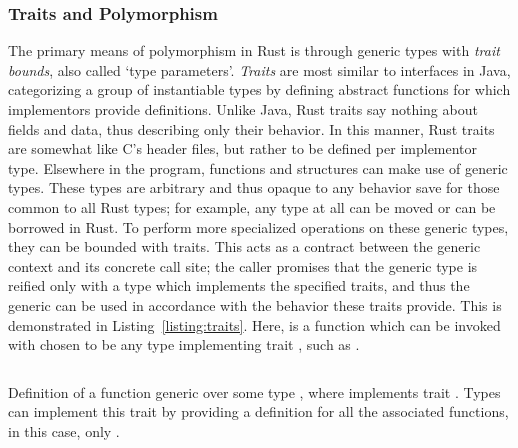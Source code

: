\subsubsection{Traits and Polymorphism}
The primary means of polymorphism in Rust is through generic types with \textit{trait bounds}, also called `type parameters'. \textit{Traits} are most similar to interfaces in Java, categorizing a group of instantiable types by defining abstract functions for which implementors provide definitions. Unlike Java, Rust traits say nothing about fields and data, thus describing only their behavior. In this manner, Rust traits are somewhat like C's header files, but rather to be defined per implementor type. Elsewhere in the program, functions and structures can make use of generic types. These types are arbitrary and thus opaque to any behavior save for those common to all Rust types; for example, any type at all can be moved or can be borrowed in Rust. To perform more specialized operations on these generic types, they can be bounded with traits. This acts as a contract between the generic context and its concrete call site; the caller promises that the generic type is reified only with a type which implements the specified traits, and thus the generic can be used in accordance with the behavior these traits provide. This is demonstrated in Listing~\ref{listing:traits}. Here,  is a function which can be invoked with  chosen to be any type implementing trait , such as . 

\begin{listing}[ht]
	\centering
	\inputminted[]{rust}{traits.rs}
	\caption[Generic type example in Rust.]{Definition of a function  generic over some type , where  implements trait . Types can implement this trait by providing a definition for all the associated functions, in this case, only .}
	\label{listing:traits}
\end{listing}

